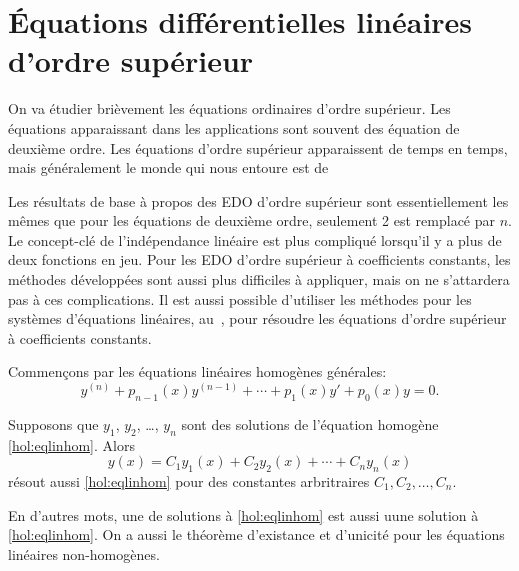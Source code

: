 \sectionnewpage
\section{Équations différentielles linéaires d'ordre supérieur} \label{sec:hol}


%

On va étudier brièvement les équations ordinaires d'ordre supérieur. Les équations apparaissant dans les applications sont souvent des équation de deuxième ordre. Les équations d'ordre supérieur apparaissent de temps en temps, mais généralement le monde qui nous entoure est de   

Les résultats de base à propos des EDO d'ordre supérieur sont essentiellement les mêmes que pour les équations de deuxième ordre, seulement 2 est remplacé par $n$.
Le concept-clé de l'indépendance linéaire est plus compliqué lorsqu'il y a plus de deux fonctions en jeu. Pour les EDO d'ordre supérieur à coefficients constants, les méthodes développées sont aussi plus difficiles à appliquer, mais on ne s'attardera pas à ces complications. Il est aussi possible d'utiliser les méthodes pour les systèmes d'équations linéaires, au~, pour résoudre les équations d'ordre supérieur à coefficients constants. 

Commençons par les équations linéaires homogènes générales: 
\begin{equation} \label{hol:eqlinhom}
y^{(n)} + p_{n-1}(x)y^{(n-1)} + \cdots + p_1(x) y' + p_0(x) y = 0 .
\end{equation}

\begin{theorem}[Superposition]
Supposons que $y_1$, $y_2$, \ldots, $y_n$ sont des solutions de l'équation homogène \eqref{hol:eqlinhom}.  Alors 
\begin{equation*}
y(x) = C_1 y_1(x) + C_2 y_2(x) + \cdots + C_n y_n(x) 
\end{equation*}
résout aussi \eqref{hol:eqlinhom}
pour des constantes arbritraires $C_1, C_2, \ldots, C_n$.
\end{theorem}

En d'autres mots, une \emph{} de solutions à \eqref{hol:eqlinhom}
est aussi uune solution à \eqref{hol:eqlinhom}.
On a aussi le théorème d'existance et d'unicité pour les équations linéaires non-homogènes. 

